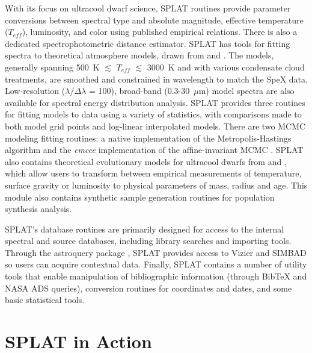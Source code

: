 \documentclass[usenatbib]{basi}
\begin{document}
With its focus on ultracool dwarf science, SPLAT routines provide parameter conversions between spectral type and absolute magnitude, effective temperature ($T_{eff}$), luminosity, and color using published empirical relations. There is also a dedicated spectrophotometric distance estimator.
SPLAT has tools for fitting spectra to theoretical atmosphere models, drawn from \citet{2012RSPTA.370.2765A,2006ApJ...640.1063B,2011ApJ...737...34M,2011A&A...529A..44W,2012ApJ...756..172M,2014ApJ...787...78M} and \citet{2012ApJ...750...74S}. The models, generally spanning 500~K $\lesssim$ $T_{eff}$ $\lesssim$ 3000~K and with various condensate cloud treatments, are smoothed and constrained in wavelength to match the SpeX data. Low-resolution ($\lambda/\Delta\lambda$ = 100), broad-band (0.3-30~$\mu$m) model spectra are also available for spectral energy distribution analysis. SPLAT provides three routines for fitting models to data using a variety of statistics, with comparisons made to both model grid points and log-linear interpolated models. There are two {MCMC} modeling fitting routines: a native implementation of the Metropolis-Hastings algorithm and the {\it emcee} implementation of the affine-invariant MCMC \citet{2013PASP..125..306F}.
SPLAT also contains theoretical evolutionary models for ultracool dwarfs from \citet{2001RvMP...73..719B,2003A&A...402..701B} and \citet{2008ApJ...689.1327S}, which allow users to transform between empirical measurements of temperature, surface gravity or luminosity to physical parameters of mass, radius and age.  This module also contains synthetic sample generation routines for population synthesis analysis.

SPLAT's database routines are primarily designed for access to the internal spectral and source databases, including library searches and importing tools. Through the astroquery package \citep{adam_ginsburg_2016_44961}, SPLAT provides access to Vizier and SIMBAD so users can acquire contextual data. 
Finally, SPLAT contains a number of utility tools that enable manipulation of bibliographic information (through BibTeX and NASA ADS queries), conversion routines for coordinates and dates, and some basic statistical tools.

%

\section{SPLAT in Action}\label{s:action}
\end{document}
